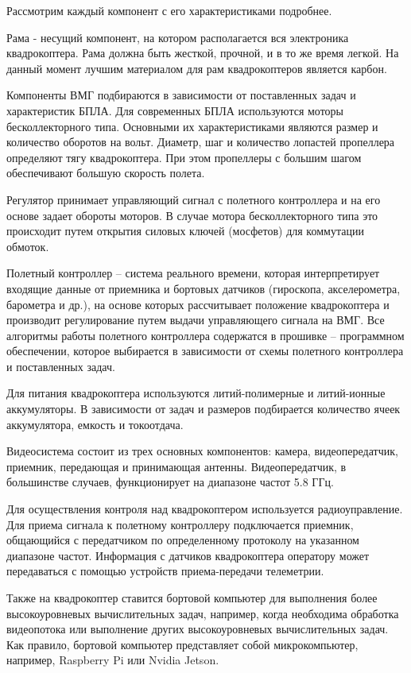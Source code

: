 Рассмотрим каждый компонент с его характеристиками подробнее.

Рама - несущий компонент, на котором располагается вся электроника квадрокоптера. Рама должна быть жесткой, прочной, и в то же время легкой. На данный момент лучшим материалом для рам квадрокоптеров является карбон.

Компоненты ВМГ подбираются в зависимости от поставленных задач и характеристик БПЛА. Для современных БПЛА используются моторы бесколлекторного типа. Основными их характеристиками являются размер и количество оборотов на вольт.
Диаметр, шаг и количество лопастей пропеллера определяют тягу квадрокоптера. При этом пропеллеры с большим шагом обеспечивают большую скорость полета.

Регулятор принимает управляющий сигнал с полетного контроллера и на его основе задает обороты моторов. В случае мотора бесколлекторного типа это происходит путем открытия силовых ключей (мосфетов) для коммутации обмоток.

Полетный контроллер -- система реального времени, которая интерпретирует входящие данные от приемника и бортовых датчиков (гироскопа, акселерометра, барометра и др.), на основе которых рассчитывает положение квадрокоптера и производит регулирование путем выдачи управляющего сигнала на ВМГ. Все алгоритмы работы полетного контроллера содержатся в прошивке -- программном обеспечении, которое выбирается в зависимости от схемы полетного контроллера и поставленных задач.

Для питания квадрокоптера используются литий-полимерные и литий-ионные аккумуляторы. В зависимости от задач и размеров подбирается количество ячеек аккумулятора, емкость и токоотдача.

Видеосистема состоит из трех основных компонентов: камера, видеопередатчик, приемник, передающая и принимающая антенны. Видеопередатчик, в большинстве случаев, функционирует на диапазоне частот 5.8 ГГц.

Для осуществления контроля над квадрокоптером используется радиоуправление. Для приема сигнала к полетному контроллеру подключается приемник, общающийся с передатчиком по определенному протоколу на указанном диапазоне частот. Информация с датчиков квадрокоптера оператору может передаваться с помощью устройств приема-передачи телеметрии.

Также на квадрокоптер ставится бортовой компьютер для выполнения более высокоуровневых вычислительных задач, например, когда необходима обработка видеопотока или выполнение других высокоуровневых вычислительных задач. Как правило, бортовой компьютер представляет собой микрокомпьютер, например, Ras\-pber\-ry Pi или Nvi\-dia Jet\-son. 

